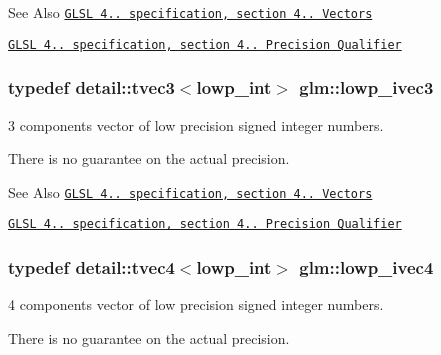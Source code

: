 \begin{DoxySeeAlso}{See Also}
\href{http://www.opengl.org/registry/doc/GLSLangSpec.4.20.8.pdf}{\tt G\-L\-S\-L 4.. specification, section 4.. Vectors} 

\href{http://www.opengl.org/registry/doc/GLSLangSpec.4.20.8.pdf}{\tt G\-L\-S\-L 4.. specification, section 4.. Precision Qualifier} 
\end{DoxySeeAlso}
\hypertarget{group__core__precision_ga61fed1e59be72903080596ebbaf2fac5}{
\subsubsection[{lowp\-\_\-ivec3}]{\setlength{\rightskip}{0pt plus 5cm}typedef detail\-::tvec3$<$lowp\-\_\-int$>$ {\bf glm\-::lowp\-\_\-ivec3}}}\label{group__core__precision_ga61fed1e59be72903080596ebbaf2fac5}


3 components vector of low precision signed integer numbers. 

There is no guarantee on the actual precision.

\begin{DoxySeeAlso}{See Also}
\href{http://www.opengl.org/registry/doc/GLSLangSpec.4.20.8.pdf}{\tt G\-L\-S\-L 4.. specification, section 4.. Vectors} 

\href{http://www.opengl.org/registry/doc/GLSLangSpec.4.20.8.pdf}{\tt G\-L\-S\-L 4.. specification, section 4.. Precision Qualifier} 
\end{DoxySeeAlso}
\hypertarget{group__core__precision_gaf6a3d7f4b43a36e905511bc0753e3158}{
\subsubsection[{lowp\-\_\-ivec4}]{\setlength{\rightskip}{0pt plus 5cm}typedef detail\-::tvec4$<$lowp\-\_\-int$>$ {\bf glm\-::lowp\-\_\-ivec4}}}\label{group__core__precision_gaf6a3d7f4b43a36e905511bc0753e3158}


4 components vector of low precision signed integer numbers. 

There is no guarantee on the actual precision.

